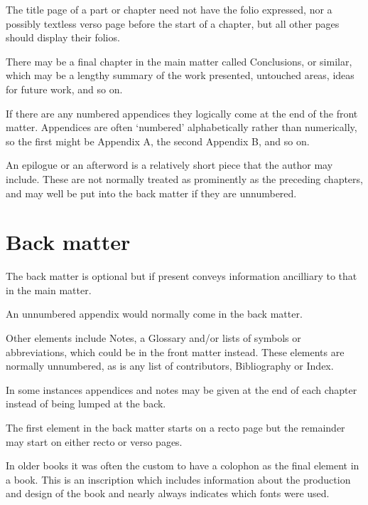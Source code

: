 \documentclass[10pt,letterpaper]{memoir}
\begin{document}
    The title page of a part
 or chapter need not have the folio expressed, nor
a possibly textless verso page before the start of a chapter, but all other 
pages should display their folios.

    There may be a final chapter in the main matter called Conclusions, 
or similar, which may be a lengthy summary of the work presented, untouched
areas, ideas for future work, and so on.

    If there are any numbered appendices 
they logically come at the end of
the front matter. Appendices are often `numbered' alphabetically rather
than numerically, so the first might be Appendix A, the second Appendix B,
and so on.

    An epilogue or an afterword is a 
relatively short piece that the author may
include. These are not normally treated as prominently as the preceding
chapters, and may well be put into the back matter if they are 
unnumbered.

\section{Back matter}

    The back matter
is optional but if present conveys information ancilliary
to that in the main matter.

    An unnumbered appendix 
would normally come in the back matter.

    Other elements include Notes, a Glossary
 and/or lists of symbols or 
abbreviations, which could be in the 
front matter 
instead. These elements 
are normally unnumbered, as is any list of contributors, 
Bibliography or Index.

    In some instances appendices 
and notes may be given at the end of each
chapter instead of being lumped at the back.

    The first element in the back matter starts on a recto page but the 
remainder may start on either recto or verso pages.

    In older books it was often the custom to have a colophon
as the final element in a book. This is an inscription which includes 
information about the production and design of the book and nearly 
always indicates which fonts were used.
\end{document}
